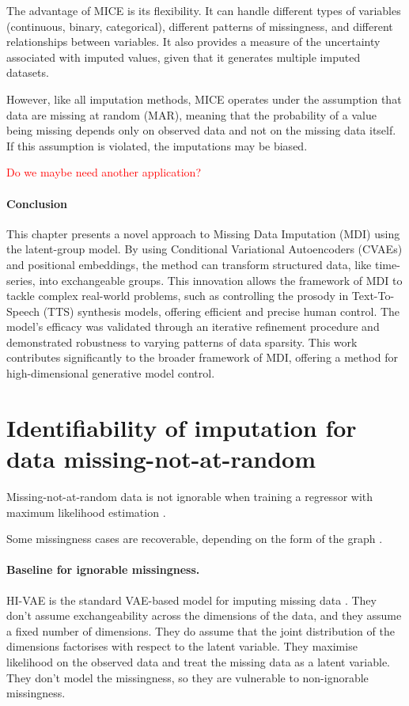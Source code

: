 \documentclass[a4paper,12pt,twoside,openright]{report}
\newcommand{\crit}[1]{\textcolor{red}{#1}}
\begin{document}
The advantage of MICE is its flexibility. It can handle different types of variables (continuous, binary, categorical), different patterns of missingness, and different relationships between variables. It also provides a measure of the uncertainty associated with imputed values, given that it generates multiple imputed datasets.

However, like all imputation methods, MICE operates under the assumption that data are missing at random (MAR), meaning that the probability of a value being missing depends only on observed data and not on the missing data itself. If this assumption is violated, the imputations may be biased.


\crit{Do we maybe need another application?}

\paragraph{Conclusion} This chapter presents a novel approach to Missing Data Imputation (MDI) using the latent-group model. By using Conditional Variational Autoencoders (CVAEs) and positional embeddings, the method can transform structured data, like time-series, into exchangeable groups. This innovation allows the framework of MDI to tackle complex real-world problems, such as controlling the prosody in Text-To-Speech (TTS) synthesis models, offering efficient and precise human control. The model's efficacy was validated through an iterative refinement procedure and demonstrated robustness to varying patterns of data sparsity. This work contributes significantly to the broader framework of MDI, offering a method for high-dimensional generative model control.

\section{Identifiability of imputation for data missing-not-at-random}

Missing-not-at-random data is not ignorable when training a regressor with maximum likelihood estimation \parencite{ibrahimMissingDataMethods2009}.

Some missingness cases are recoverable, depending on the form of the graph \parencite{mohanGraphicalModelsInference2013}.

\paragraph{Baseline for ignorable missingness.} HI-VAE is the standard VAE-based model for imputing missing data \parencite{nazabalHandlingIncompleteHeterogeneous2020}. They don't assume exchangeability across the dimensions of the data, and they assume a fixed number of dimensions. They do assume that the joint distribution of the dimensions factorises with respect to the latent variable. They maximise likelihood on the observed data and treat the missing data as a latent variable. They don't model the missingness, so they are vulnerable to non-ignorable missingness.
\end{document}
